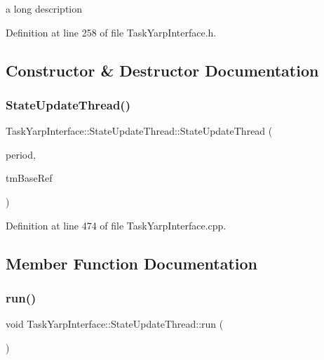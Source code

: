 a long description 

Definition at line 258 of file Task\+Yarp\+Interface.\+h.



\subsection{Constructor \& Destructor Documentation}
\hypertarget{classocra_1_1TaskYarpInterface_1_1StateUpdateThread_acd0edcec12037183ec9b7aab8dafbd99}{}\label{classocra_1_1TaskYarpInterface_1_1StateUpdateThread_acd0edcec12037183ec9b7aab8dafbd99} 
\subsubsection{\texorpdfstring{State\+Update\+Thread()}{StateUpdateThread()}}
{\footnotesize\ttfamily Task\+Yarp\+Interface\+::\+State\+Update\+Thread\+::\+State\+Update\+Thread (\begin{DoxyParamCaption}\item[{int}]{period,  }\item[{\hyperlink{classocra_1_1TaskYarpInterface}{Task\+Yarp\+Interface} \&}]{tm\+Base\+Ref }\end{DoxyParamCaption})}



Definition at line 474 of file Task\+Yarp\+Interface.\+cpp.



\subsection{Member Function Documentation}
\hypertarget{classocra_1_1TaskYarpInterface_1_1StateUpdateThread_ae6be513380cf7cd48fac252379536479}{}\label{classocra_1_1TaskYarpInterface_1_1StateUpdateThread_ae6be513380cf7cd48fac252379536479} 
\subsubsection{\texorpdfstring{run()}{run()}}
{\footnotesize\ttfamily void Task\+Yarp\+Interface\+::\+State\+Update\+Thread\+::run (\begin{DoxyParamCaption}{ }\end{DoxyParamCaption})}



